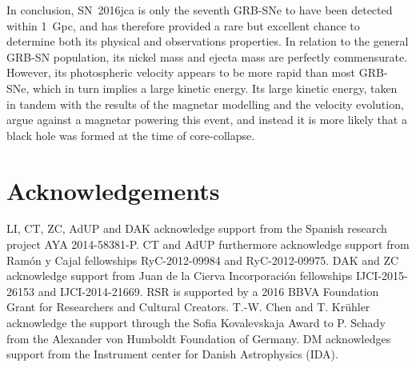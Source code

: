 \documentclass[traditabstract,longauth]{aa}
\begin{document}
In conclusion, SN~2016jca is only the seventh GRB-SNe to have been detected within 1~Gpc, and has therefore provided a rare but excellent chance to determine both its physical and observations properties.  In relation to the general GRB-SN population, its nickel mass and ejecta mass are perfectly commensurate.  However, its photospheric velocity appears to be more rapid than most GRB-SNe, which in turn implies a large kinetic energy.  Its large kinetic energy, taken in tandem with the results of the magnetar modelling and the velocity evolution, argue against a magnetar powering this event, and instead it is more likely that a black hole was formed at the time of core-collapse.



\section{Acknowledgements}

LI, CT, ZC, AdUP and DAK acknowledge support from the Spanish research project AYA 2014-58381-P. CT and AdUP furthermore acknowledge support from Ram\'on y Cajal fellowships RyC-2012-09984 and RyC-2012-09975. DAK and ZC acknowledge support from Juan de la Cierva Incorporaci\'on fellowships IJCI-2015-26153 and IJCI-2014-21669. RSR is supported by a 2016 BBVA Foundation Grant for Researchers and Cultural Creators. T.-W. Chen and T. Kr\"uhler acknowledge the support through the Sofia Kovalevskaja Award to P. Schady from the Alexander von Humboldt Foundation of Germany. DM acknowledges support from the Instrument center for Danish Astrophysics (IDA).
\end{document}
